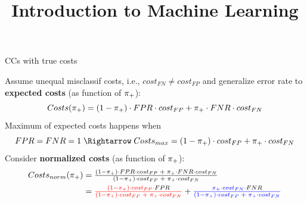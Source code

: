 \documentclass[11pt,compress,t,notes=noshow, xcolor=table]{beamer}
\title{Introduction to Machine Learning}
\institute{\href{https://compstat-lmu.github.io/lecture_i2ml/}{compstat-lmu.github.io/lecture\_i2ml}}
\date{}
\begin{document}
\sloppy



\begin{vbframe}{CCs with true costs}

Assume unequal misclassif costs, i.e., $cost_{FN} \neq cost_{FP}$ and generalize error rate to \textbf{expected costs} (as function of $\pi_{+}$): %
$$Costs(\pi_{+}) = (1 - \pi_{+}) \cdot FPR \cdot cost_{FP} + \pi_{+} \cdot FNR \cdot cost_{FN}$$
Maximum of expected costs happens when
$$FPR=FNR=1 \; \Rightarrow \; Costs_{max} = (1 - \rp) \cdot cost_{FP} + \rp \cdot cost_{FN}$$
Consider \textbf{normalized costs} (as function of $\pi_{+}$):
\begin{align*}
Costs_{norm}(\pi_{+})
&= \tfrac{(1 - \pi_{+}) \cdot FPR \cdot cost_{FP}  \; + \; \pi_{+} \cdot FNR \cdot cost_{FN} }{(1 - \pi_{+}) \cdot cost_{FP} \; + \; \pi_{+} \cdot cost_{FN}}\\
&= {\color{red}\tfrac{(1 - \pi_{+})\cdot cost_{FP} \cdot {\color{black}FPR}}{(1 - \pi_{+}) \cdot cost_{FP} \; + \; \pi_{+} \cdot cost_{FN}}} + {\color{blue}\tfrac{\pi_{+} \cdot cost_{FN} \cdot {\color{black}FNR}}{(1 - \pi_{+}) \cdot cost_{FP} \; + \; \pi_{+} \cdot cost_{FN}}}
\end{align*}


\end{vbframe}
\end{document}

